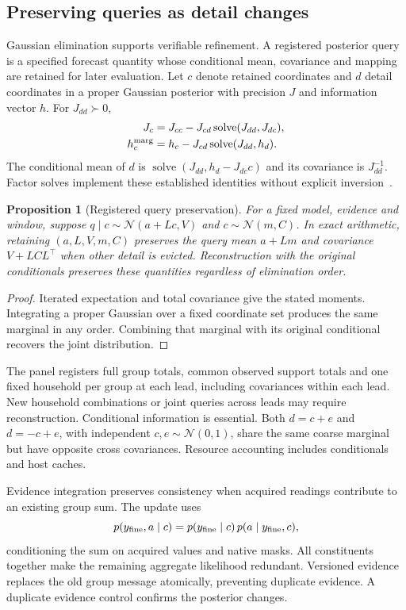 \documentclass[conference]{IEEEtran}
\newtheorem{proposition}{Proposition}
\begin{document}
\subsection{Preserving queries as detail changes}
Gaussian elimination supports verifiable refinement. A registered posterior query is a specified forecast quantity whose conditional mean, covariance and mapping are retained for later evaluation. Let $c$ denote retained coordinates and $d$ detail coordinates in a proper Gaussian posterior with precision $J$ and information vector $h$. For $J_{dd}\succ0$,
\begin{align}
J_c&=J_{cc}-J_{cd}\operatorname{solve}(J_{dd},J_{dc}),\label{eq:schur}\\
h_c^{\rm marg}&=h_c-J_{cd}\operatorname{solve}(J_{dd},h_d).
\end{align}
The conditional mean of $d$ is $\operatorname{solve}(J_{dd},h_d-J_{dc}c)$ and its covariance is $J_{dd}^{-1}$. Factor solves implement these established identities without explicit inversion~\cite{distributed,isam}.

\begin{proposition}[Registered query preservation]
For a fixed model, evidence and window, suppose
$q\mid c\sim\mathcal N(a+Lc,V)$ and $c\sim\mathcal N(m,C)$. In exact arithmetic, retaining $(a,L,V,m,C)$ preserves the query mean $a+Lm$ and covariance $V+LCL^\top$ when other detail is evicted. Reconstruction with the original conditionals preserves these quantities regardless of elimination order.
\end{proposition}
\begin{proof}
Iterated expectation and total covariance give the stated moments. Integrating a proper Gaussian over a fixed coordinate set produces the same marginal in any order. Combining that marginal with its original conditional recovers the joint distribution.
\end{proof}

The panel registers full group totals, common observed support totals and one fixed household per group at each lead, including covariances within each lead. New household combinations or joint queries across leads may require reconstruction. Conditional information is essential. Both $d=c+e$ and $d=-c+e$, with independent $c,e\sim\mathcal N(0,1)$, share the same coarse marginal but have opposite cross covariances. Resource accounting includes conditionals and host caches.

Evidence integration preserves consistency when acquired readings contribute to an existing group sum. The update uses
\begin{equation}
p(y_{\rm fine},a\mid c)
=p(y_{\rm fine}\mid c)\,p(a\mid y_{\rm fine},c),\label{eq:replace}
\end{equation}
conditioning the sum on acquired values and native masks. All constituents together make the remaining aggregate likelihood redundant. Versioned evidence replaces the old group message atomically, preventing duplicate evidence. A duplicate evidence control confirms the posterior changes.
\end{document}
